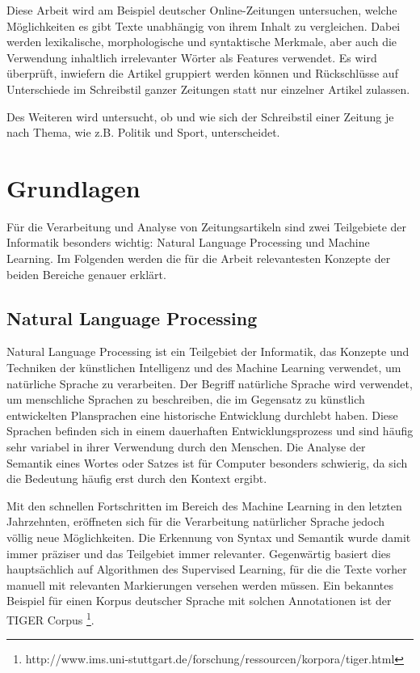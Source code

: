 Diese Arbeit wird am Beispiel deutscher Online-Zeitungen untersuchen, welche Möglichkeiten es gibt Texte unabhängig von ihrem Inhalt zu vergleichen. Dabei werden lexikalische, morphologische und syntaktische Merkmale, aber auch die Verwendung inhaltlich irrelevanter Wörter als Features verwendet. Es wird überprüft, inwiefern die Artikel gruppiert werden können und Rückschlüsse auf Unterschiede im Schreibstil ganzer Zeitungen statt nur einzelner Artikel zulassen.

Des Weiteren wird untersucht, ob und wie sich der Schreibstil einer Zeitung je nach Thema, wie z.B. Politik und Sport, unterscheidet.

\chapter{Grundlagen}
Für die Verarbeitung und Analyse von Zeitungsartikeln sind zwei Teilgebiete der Informatik besonders wichtig: Natural Language Processing und Machine Learning. Im Folgenden werden die für die Arbeit relevantesten Konzepte der beiden Bereiche genauer erklärt.

\section{Natural Language Processing}
Natural Language Processing ist ein Teilgebiet der Informatik, das Konzepte und Techniken der künstlichen Intelligenz und des Machine Learning verwendet, um natürliche Sprache zu verarbeiten. Der Begriff natürliche Sprache wird verwendet, um menschliche Sprachen zu beschreiben, die im Gegensatz zu künstlich entwickelten Plansprachen eine historische Entwicklung durchlebt haben. Diese Sprachen befinden sich in einem dauerhaften Entwicklungsprozess und sind häufig sehr variabel in ihrer Verwendung durch den Menschen. Die Analyse der Semantik eines Wortes oder Satzes ist für Computer besonders schwierig, da sich die Bedeutung häufig erst durch den Kontext ergibt.

Mit den schnellen Fortschritten im Bereich des Machine Learning in den letzten Jahrzehnten, eröffneten sich für die Verarbeitung natürlicher Sprache jedoch völlig neue Möglichkeiten. Die Erkennung von Syntax und Semantik wurde damit immer präziser und das Teilgebiet immer relevanter. Gegenwärtig basiert dies hauptsächlich auf Algorithmen des Supervised Learning, für die die Texte vorher manuell mit relevanten Markierungen versehen werden müssen. Ein bekanntes Beispiel für einen Korpus deutscher Sprache mit solchen Annotationen ist der TIGER Corpus \footnote{http://www.ims.uni-stuttgart.de/forschung/ressourcen/korpora/tiger.html}.

